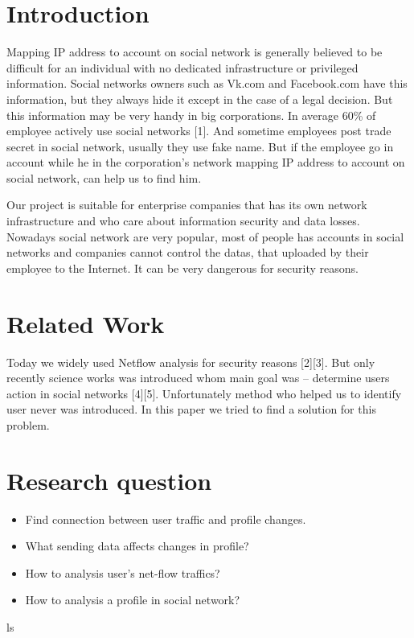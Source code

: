 \documentclass[12pt,a4paper]{report}
\begin{document}
\section{Introduction}
Mapping IP address to account on social network is generally believed to be difficult for an individual with no dedicated infrastructure or privileged information. Social networks owners such as Vk.com and Facebook.com have this information, but they always hide it except in the case of a legal decision. But this information may be very handy in big corporations. In average 60\% of employee actively use social networks [1]. And sometime employees post trade secret in social network, usually they use fake name. But if the employee go in account while he in the corporation's network mapping IP address to account on social network, can help us to find him.

Our project is suitable for enterprise companies that has its own network infrastructure and who care about information security and data losses. Nowadays social network are very popular, most of people has accounts in social networks and companies cannot control the datas, that uploaded by their employee to the Internet. It can be very dangerous for security reasons.

\section{Related Work}
Today we widely used Netflow analysis for security reasons [2][3]. But only recently science works was introduced whom main goal was – determine users action in social networks [4][5]. Unfortunately method who helped us to identify user never was introduced. In this paper we tried to find a solution for this problem.

\section{Research question}
\begin{itemize}
	\item{Find connection between user traffic and profile changes.}
	\item{What sending data affects changes in profile?}
	\item{How to analysis user's net-flow traffics?}
	\item{How to analysis a profile in social network?}
\end{itemize}ls
\end{document}
